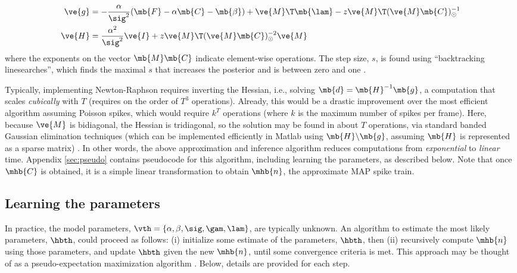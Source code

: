 \begin{subequations} \label{eq:NR}
\begin{align}
\ve{g} &= -\frac{\alpha}{\sig^2}(\mb{F} -\alpha \mb{C} - \mb{\beta}) + \ve{M}\T\mb{\lam} - \zzz \ve{M}\T (\ve{M} \mb{C})^{-1}_\odot \label{eq:g} \\
\ve{H} &= \frac{\alpha^2}{\sig^2} \ve{I} + \zzz \ve{M}\T (\ve{M} \mb{C})^{-2}_\odot \ve{M} \label{eq:H}
\end{align}
\end{subequations}
\noindent where the exponents on the vector $\mb{M} \mb{C}$ indicate element-wise operations. The step size, $s$, is found using ``backtracking linesearches'', which finds the maximal $s$ that increases the posterior and is between zero and one \cite{Press92}.

Typically, implementing Newton-Raphson requires inverting the Hessian, i.e.,  solving $\mb{d} = \mb{H}^{-1} \mb{g}$, a computation that scales \emph{cubically} with $T$ (requires on the order of $T^3$ operations). Already, this would be a drastic improvement over the most efficient algorithm assuming Poisson spikes, which would require $k^T$ operations (where $k$ is the maximum number of spikes per frame).  Here, because $\ve{M}$ is bidiagonal, the Hessian is tridiagonal, so the solution may be found in about $T$ operations, via standard banded Gaussian elimination techniques (which can be implemented efficiently in Matlab using $\mb{H} \backslash \mb{g}$, assuming $\mb{H}$ is represented as a sparse matrix) \cite{PaninskiWu09}. In other words, the above approximation and inference algorithm reduces computations from \emph{exponential} to \emph{linear} time.  Appendix \ref{sec:pseudo} contains pseudocode for this algorithm, including learning the parameters, as described below. Note that once $\mhb{C}$ is obtained, it is a simple linear transformation to obtain $\mhb{n}$, the approximate MAP spike train.





\subsection{Learning the parameters} \label{sec:learn}

In practice, the model parameters, $\vth=\{\alpha, \beta, \sig, \gam, \lam\}$, are typically unknown.  An algorithm to estimate the most likely parameters, $\hbth$, could proceed as follows: (i) initialize some estimate of the parameters, $\hbth$, then (ii) recursively compute $\mhb{n}$ using those parameters, and update $\hbth$ given the new $\mhb{n}$, until some convergence criteria is met.  This approach may be thought of as a pseudo-expectation maximization algorithm \cite{DempsterRubin77}. Below, details are provided for each step.

